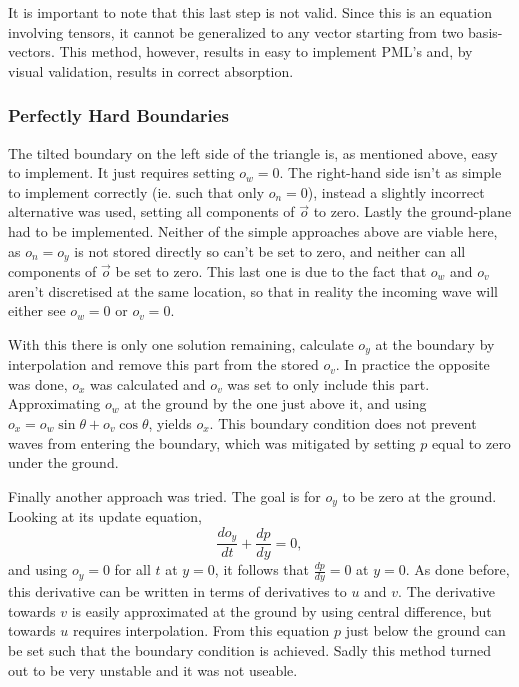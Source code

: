 \documentclass{article}
\begin{document}
It is important to note that this last step is not valid.
Since this is an equation involving tensors, 
it cannot be generalized to any vector starting from two basis-vectors.
This method, however, results in easy to implement PML's
and, by visual validation, results in correct absorption.

\subsubsection{Perfectly Hard Boundaries}

The tilted boundary on the left side of the triangle is, 
as mentioned above, easy to implement. 
It just requires setting \(o_w = 0\).
The right-hand side isn't as simple to implement correctly 
(ie. such that only \(o_n = 0\)), 
instead a slightly incorrect alternative was used,
setting all components of \(\vec{o}\) to zero.
Lastly the ground-plane had to be implemented. 
Neither of the simple approaches above are viable here,
as \(o_n = o_y\) is not stored directly so can't be set to zero,
and neither can all components of \(\vec{o}\) be set to zero.
This last one is due to the fact that \(o_w\) and \(o_v\) aren't discretised at the same location,
so that in reality the incoming wave will either see \(o_w = 0\) or \(o_v = 0\).

With this there is only one solution remaining, 
calculate \(o_y\) at the boundary by interpolation and remove this part from the stored \(o_v\).
In practice the opposite was done, \(o_x\) was calculated and \(o_v\) was set to only include this part.
Approximating \(o_w\) at the ground by the one just above it,
and using \(o_x = o_w \sin \theta + o_v \cos \theta\),
yields \(o_x\).
This boundary condition does not prevent waves from entering the boundary,
which was mitigated by setting \(p\) equal to zero under the ground.

Finally another approach was tried.
The goal is for \(o_y\) to be zero at the ground.
Looking at its update equation, 
\[ \frac{do_y}{dt} + \frac{dp}{dy} = 0, \]
and using \(o_y = 0\) for all \(t\) at \(y=0\),
it follows that \(\frac{dp}{dy} = 0\) at \(y=0\).
As done before, this derivative can be written in terms of derivatives to \(u\) and \(v\).
The derivative towards \(v\) is easily approximated at the ground by using central difference,
but towards \(u\) requires interpolation. 
From this equation \(p\) just below the ground can be set such that the boundary condition is achieved.
Sadly this method turned out to be very unstable and it was not useable.
\end{document}
